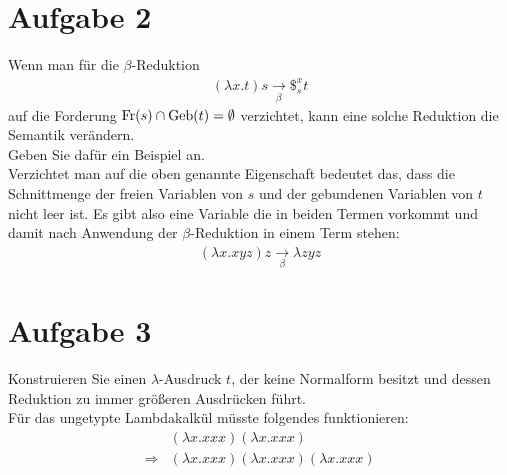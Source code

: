 \documentclass[ngerman,a4paper]{report}
\begin{document}
\section*{Aufgabe 2}
Wenn man für die $\beta$-Reduktion
\begin{align*}
(\lambda x.t) s \xrightarrow[\beta]{} \$_s^x t
\end{align*}
auf die Forderung $\text{\lstinline!Fr!}(s) \cap \text{\lstinline!Geb!}(t) = \emptyset$ verzichtet, kann eine solche Reduktion die Semantik verändern.\\
Geben Sie dafür ein Beispiel an.\\

Verzichtet man auf die oben genannte Eigenschaft bedeutet das, dass die Schnittmenge der freien Variablen von $s$ und der gebundenen Variablen von $t$ nicht leer ist. Es gibt also eine Variable die in beiden Termen vorkommt und damit nach Anwendung der $\beta$-Reduktion in einem Term stehen:
\begin{align*}
(\lambda x.xyz) z \xrightarrow[\beta]{} \lambda zyz
\end{align*}

\section*{Aufgabe 3}
Konstruieren Sie einen $\lambda$-Ausdruck $t$, der keine Normalform besitzt und dessen Reduktion zu immer größeren Ausdrücken führt.\\
%
Für das ungetypte Lambdakalkül müsste folgendes funktionieren:\\
\begin{align*}
	&    (\lambda x.xxx)(\lambda x.xxx)\\
	\Rightarrow&(\lambda x.xxx)(\lambda x.xxx)(\lambda x.xxx)\\
\end{align*}
\end{document}
